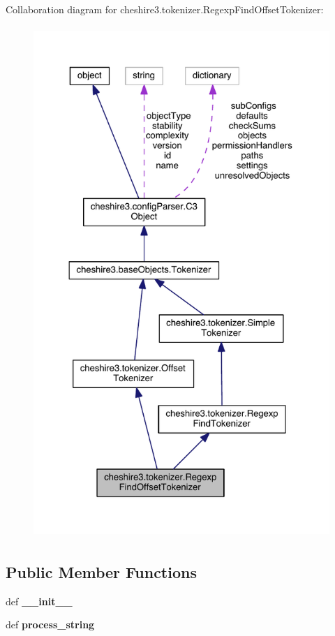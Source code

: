 Collaboration diagram for cheshire3.\-tokenizer.\-Regexp\-Find\-Offset\-Tokenizer\-:
\nopagebreak
\begin{figure}[H]
\begin{center}
\leavevmode
\includegraphics[height=550pt]{classcheshire3_1_1tokenizer_1_1_regexp_find_offset_tokenizer__coll__graph}
\end{center}
\end{figure}
\subsection*{Public Member Functions}
\begin{DoxyCompactItemize}
\item 
\hypertarget{classcheshire3_1_1tokenizer_1_1_regexp_find_offset_tokenizer_a79094037d78421524c69369d4717fbb5}{def {\bfseries \-\_\-\-\_\-init\-\_\-\-\_\-}}\label{classcheshire3_1_1tokenizer_1_1_regexp_find_offset_tokenizer_a79094037d78421524c69369d4717fbb5}

\item 
\hypertarget{classcheshire3_1_1tokenizer_1_1_regexp_find_offset_tokenizer_a47f7f9af88c3fbb33324c9259e683809}{def {\bfseries process\-\_\-string}}\label{classcheshire3_1_1tokenizer_1_1_regexp_find_offset_tokenizer_a47f7f9af88c3fbb33324c9259e683809}

\end{DoxyCompactItemize}
